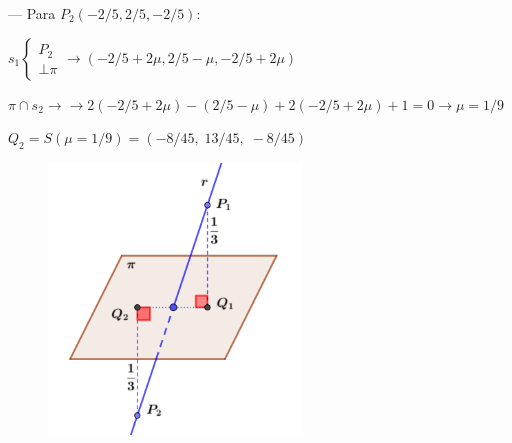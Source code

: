 \begin{proofw}
\noindent --- Para $P_2(-2/5,2/5,-2/5)$:

\noindent $s_1\begin{cases}P_2\\\bot \pi \end{cases}\to (-2/5+2\mu,2/5-\mu,-2/5+2\mu)$

\noindent $\pi \cap s_2 \to  \to 
2(-2/5+2\mu)-(2/5-\mu)+2(-2/5+2\mu)+1=0 \to 
\mu=1/9$

\noindent $Q_2=S(\mu=1/9)=(-8/45,\; 13/45,\; -8/45)$
	
	
	\begin{figure}[H]
		\centering
		\includegraphics[width=0.6\textwidth]{imagenes/imagenes11/T11IM28.png}
	\end{figure}
\end{proofw}

